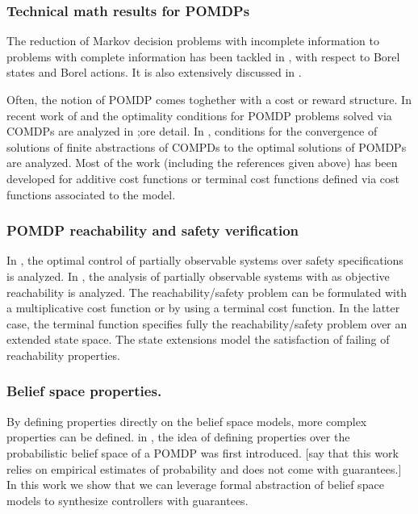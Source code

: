 \documentclass{ifacconf}
\newcommand{\red}[1]{{\color{red} #1}}
\begin{document}
\subsubsection{Technical math results for POMDPs}
The reduction of Markov decision problems with incomplete information to problems with complete information has been tackled in
\cite{yushkevich_reduction_1976,rhenius_incomplete_1974}, with respect to Borel states and Borel actions. It is also extensively discussed in \citep[Chapter 11]{bertsekas2004stochastic}.

Often, the notion of POMDP comes toghether with a cost or reward structure. 
In recent work of \cite{feinberg2014optimality}  and \cite{feinberg2016partially} the optimality conditions for POMDP problems solved via \red{COMDPs} are analyzed in ;ore detail. 
In \cite{saldi2017finite}, conditions for the convergence of solutions of finite abstractions of COMPDs to the optimal solutions of POMDPs are analyzed. 
Most of the work (including the references given above) has been developed for additive cost functions or terminal cost functions defined via cost functions associated to the model. 


\subsubsection{POMDP reachability and safety verification}


In \cite{ding2013optimal}, the optimal control of partially observable systems over safety specifications is analyzed. 
In \cite{LESSER20141989}, the analysis of partially observable systems with as objective reachability is analyzed. 
The reachability/safety problem can be formulated with a multiplicative cost function or by using a terminal cost function. In the latter case, the terminal function specifies fully the reachability/safety problem over an extended state space.
The state extensions model the satisfaction of failing of reachability properties.

\subsubsection{Belief space properties.} By defining properties directly on the belief space models, more complex properties can be defined. in \cite{JonesDTL2013}, the idea of defining properties over the probabilistic belief space of a POMDP was first introduced.  \red{[say that this work relies on empirical estimates of probability and does not come with guarantees.]}
In this work we show that we can leverage formal abstraction of belief space models to synthesize controllers with guarantees.
\end{document}
